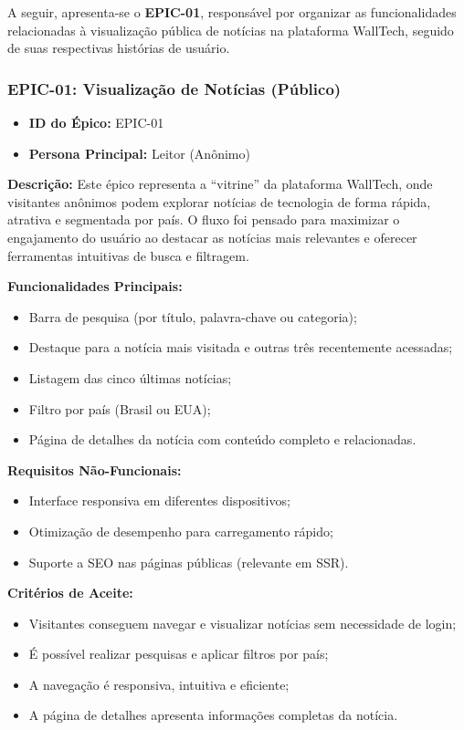 A seguir, apresenta-se o \textbf{EPIC-01}, responsável por organizar as funcionalidades relacionadas à visualização pública de notícias na plataforma WallTech, seguido de suas respectivas histórias de usuário.

\subsubsection*{EPIC-01: Visualização de Notícias (Público)}

\begin{itemize}
  \item \textbf{ID do Épico:} EPIC-01
  \item \textbf{Persona Principal:} Leitor (Anônimo)
\end{itemize}

\noindent \textbf{Descrição:} Este épico representa a “vitrine” da plataforma WallTech, onde visitantes anônimos podem explorar notícias de tecnologia de forma rápida, atrativa e segmentada por país. O fluxo foi pensado para maximizar o engajamento do usuário ao destacar as notícias mais relevantes e oferecer ferramentas intuitivas de busca e filtragem.

\noindent \textbf{Funcionalidades Principais:}
\begin{itemize}
  \item Barra de pesquisa (por título, palavra-chave ou categoria);
  \item Destaque para a notícia mais visitada e outras três recentemente acessadas;
  \item Listagem das cinco últimas notícias;
  \item Filtro por país (Brasil ou EUA);
  \item Página de detalhes da notícia com conteúdo completo e relacionadas.
\end{itemize}

\noindent \textbf{Requisitos Não-Funcionais:}
\begin{itemize}
  \item Interface responsiva em diferentes dispositivos;
  \item Otimização de desempenho para carregamento rápido;
  \item Suporte a SEO nas páginas públicas (relevante em SSR).
\end{itemize}

\noindent \textbf{Critérios de Aceite:}
\begin{itemize}
  \item Visitantes conseguem navegar e visualizar notícias sem necessidade de login;
  \item É possível realizar pesquisas e aplicar filtros por país;
  \item A navegação é responsiva, intuitiva e eficiente;
  \item A página de detalhes apresenta informações completas da notícia.
\end{itemize}

